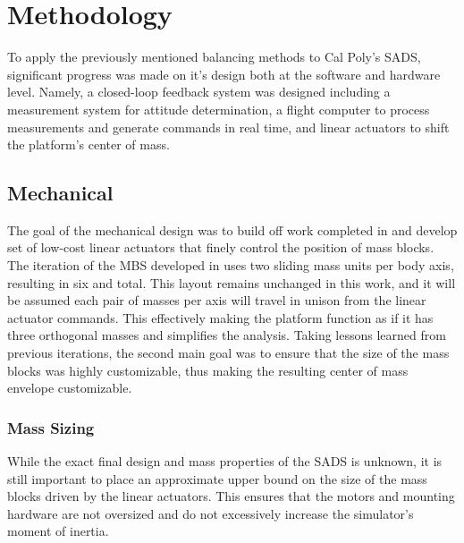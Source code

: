 \chapter{Methodology}\label{chap:methodology}

To apply the previously mentioned balancing methods to Cal Poly's SADS, significant progress was made on it's design both at the software and hardware level. Namely, a closed-loop feedback system was designed including a measurement system for attitude determination, a flight computer to process measurements and generate commands in real time, and linear actuators to shift the platform's center of mass.

\section{Mechanical}

The goal of the mechanical design was to build off work completed in \cite{gilman_automatic_2024} and develop set of low-cost linear actuators that finely control the position of mass blocks. The iteration of the MBS developed in \cite{gilman_automatic_2024} uses two sliding mass units per body axis, resulting in six and total. This layout remains unchanged in this work, and it will be assumed each pair of masses per axis will travel in unison from the linear actuator commands. This effectively making the platform function as if it has three orthogonal masses and simplifies the analysis. Taking lessons learned from previous iterations, the second main goal was to ensure that the size of the mass blocks was highly customizable, thus making the resulting center of mass envelope customizable. 

\subsection{Mass Sizing}

While the exact final design and mass properties of the SADS is unknown, it is still important to place an approximate upper bound on the size of the mass blocks driven by the linear actuators. This ensures that the motors and mounting hardware are not oversized and do not excessively increase the simulator's moment of inertia.


